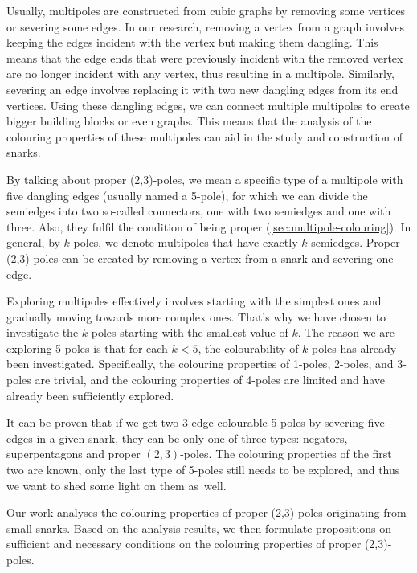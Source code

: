 Usually, multipoles are constructed from cubic graphs by removing some vertices or severing some edges. In our research, removing a vertex from a graph involves keeping the edges incident with the vertex but making them dangling. This means that the edge ends that were previously incident with the removed vertex are no longer incident with any vertex, thus resulting in a multipole. Similarly, severing an edge involves replacing it with two new dangling edges from its end vertices. Using these dangling edges, we can connect multiple multipoles to create bigger building blocks or even graphs. This means that the analysis of the colouring properties of these multipoles can aid in the study and construction of snarks.

By talking about proper (2,3)-poles, we mean a specific type of a multipole with five dangling edges (usually named a 5-pole), for which we can divide the semiedges into two so-called connectors, one with two semiedges and one with three. Also, they fulfil the condition of being proper (\cref{sec:multipole-colouring}). In general, by $k$-poles, we denote multipoles that have exactly $k$ semiedges. Proper (2,3)-poles can be created by removing a vertex from a snark and severing one edge.

Exploring multipoles effectively involves starting with the simplest ones and gradually moving towards more complex ones. That's why we have chosen to investigate the $k$-poles starting with the smallest value of $k$. The reason we are exploring 5-poles is that for each $k<5$, the colourability of $k$-poles has already been investigated. Specifically, the colouring properties of 1-poles, 2-poles, and 3-poles are trivial, and the colouring properties of 4-poles are limited and have already been sufficiently explored.

It can be proven that if we get two 3-edge-colourable 5-poles by severing five edges in a given snark, they can be only one of three types: negators, superpentagons and proper $(2,3)$-poles. The colouring properties of the first two are known, only the last type of 5-poles still needs to be explored, and thus we want to shed some light on them as~well.

Our work analyses the colouring properties of proper (2,3)-poles originating from small snarks. Based on the analysis results, we then formulate propositions on sufficient and necessary conditions on the colouring properties of proper (2,3)-poles. 

